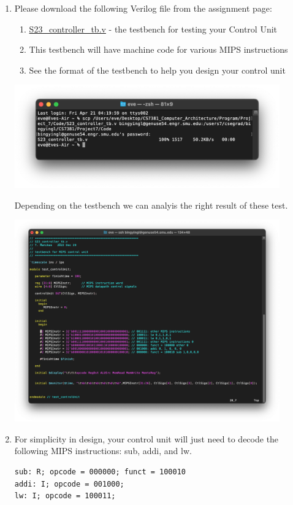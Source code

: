 \documentclass[12pt]{article}
\begin{document}
\begin{enumerate}
    \item Please download the following Verilog file from the assignment page:
    \begin{enumerate}
        \item \href{https://smu.instructure.com/courses/106177/files/7256739?wrap=1}{S23\_controller\_tb.v} - the testbench for testing your Control Unit
        \item This testbench will have machine code for various MIPS instructions
        \item See the format of the testbench to help you design your control unit
    \end{enumerate}
            \begin{center}
        \includegraphics[width=0.9\textwidth]{p1.png}
        \end{center}

        Depending on the testbench we can analyis the right result of these test.
        \begin{center}
            \includegraphics[width=0.9\textwidth]{p2.png}
        \end{center}
    \item For simplicity in design, your control unit will just need to decode the following MIPS instructions: sub, addi, and lw.  
     \begin{verbatim}
sub: R; opcode = 000000; funct = 100010 
addi: I; opcode = 001000;  
lw: I; opcode = 100011; 
\end{verbatim}
    


\end{enumerate}
\end{document}
